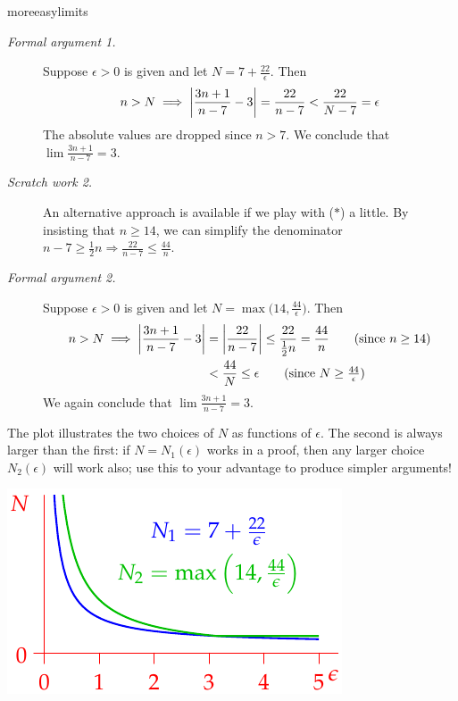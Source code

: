 \begin{examples}{}{moreeasylimits}
\begin{enumerate}
\begin{description}
			\item[\normalfont\emph{Formal argument 1.}] Suppose $\epsilon>0$ is given and let $N=7+\frac{22}{\epsilon}$. Then
			\[
				n>N\implies \left| \frac{3n+1}{n-7}-3\right| =\frac{22}{n-7} <\frac{22}{N-7}=\epsilon
			\]
			The absolute values are dropped since $n>7$. We conclude that $\lim\frac{3n+1}{n-7}=3$.
		
			\item[\normalfont\emph{Scratch work 2.}] An alternative approach is available if we play with ($\ast$) a little. By insisting that $n\ge 14$, we can simplify the denominator $n-7\ge \frac 12n\Longrightarrow \frac{22}{n-7}\le \frac{44}n$.
		
			\item[\normalfont\emph{Formal argument 2.}] Suppose $\epsilon>0$ is given and let $N=\max\bigl(14,\frac{44}{\epsilon}\bigr)$. Then
			\begin{align*}
				n>N\implies \nm{\frac{3n+1}{n-7}-3}&=\nm{\frac{22}{n-7}}\le\frac{22}{\frac 12n} =\frac{44}n \tag{since $n\ge 14$}\\
				&<\frac{44}N \le\epsilon\tag*{(since $N\ge \frac{44}\epsilon$)}
			\end{align*}
			We again conclude that $\lim\frac{3n+1}{n-7}=3$.
		\end{description}
		
		\begin{minipage}[t]{0.6\linewidth}\vspace{0pt}
			The plot illustrates the two choices of $N$ as functions of $\epsilon$. The second is always larger than the first: if $N=N_1(\epsilon)$ works in a proof, then any larger choice $N_2(\epsilon)$ will work also; use this to your advantage to produce simpler arguments!
		\end{minipage}
		\hfill
		\begin{minipage}[t]{0.39\linewidth}\vspace{-30pt}
			\flushright\includegraphics[scale=0.95]{epsilonNex}
		\end{minipage}



\end{enumerate}
\end{examples}
